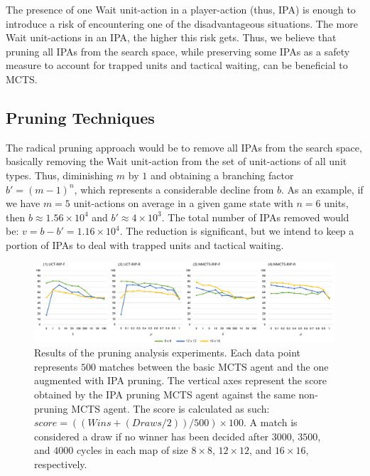 \documentclass[conference]{IEEEtran}
\begin{document}
The presence of one Wait unit-action in a player-action (thus, IPA) is enough to introduce a risk of encountering one of the disadvantageous situations. The more Wait unit-actions in an IPA, the higher this risk gets. Thus, we believe that pruning all IPAs from the search space, while preserving some IPAs as a safety measure to account for trapped units and tactical waiting, can be beneficial to MCTS.



\subsection{Pruning Techniques}

The radical pruning approach would be to remove all IPAs from the search space, basically removing the Wait unit-action from the set of unit-actions of all unit types. Thus, diminishing $m$ by $1$ and obtaining a branching factor $b' = (m - 1)^n$, which represents a considerable decline from $b$. As an example, if we have $m=5$ unit-actions on average in a given game state with $n=6$ units, then $b \approx 1.56\times10^4$ and $b' \approx 4\times10^3$. The total number of IPAs removed would be: $v = b - b' = 1.16\times10^4$. The reduction is significant, but we intend to keep a portion of IPAs to deal with trapped units and tactical waiting.

\begin{figure}[!h]
\begin{center}
	\includegraphics[width=1\textwidth]{figs/PT-h.pdf}
	\caption{Results of the pruning analysis experiments. Each data point represents $500$ matches between the basic MCTS agent and the one augmented with IPA pruning. The vertical axes represent the score obtained by the IPA pruning MCTS agent against the same non-pruning MCTS agent. The score is calculated as such: $score = ((Wins + (Draws / 2)) / 500) \times 100$. A match is considered a draw if no winner has been decided after $3000$, $3500$, and $4000$ cycles in each map of size $8\times8$, $12\times12$, and $16\times16$, respectively.}
	\label{PruningAnalysis}
\end{center}
\end{figure}
\end{document}

